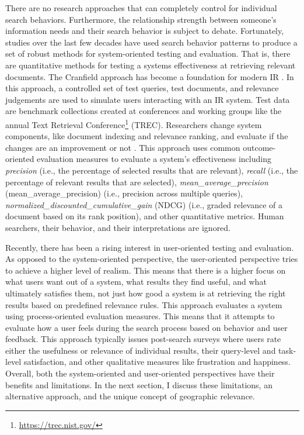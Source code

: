 There are no research approaches that can completely control for individual search behaviors. Furthermore, the relationship strength between someone's information needs and their search behavior is subject to debate. Fortunately, studies over the last few decades have used search behavior patterns to produce a set of robust methods for system-oriented testing and evaluation. That is, there are quantitative methods for testing a systems effectiveness at retrieving relevant documents. The Cranfield approach has become a foundation for modern IR \cite{Sanderson2010}. In this approach, a controlled set of test queries, test documents, and relevance judgements are used to simulate users interacting with an IR system. Test data are benchmark collections created at conferences and working groups like the annual Text Retrieval Conference\footnote{\url{https://trec.nist.gov/}} (\acrshort{TREC}). Researchers change system components, like document indexing and relevance ranking, and evaluate if the changes are an improvement or not \cite{McGill1979}. This approach uses common outcome-oriented evaluation measures to evaluate a system's effectiveness including \emph{\gls{precision}} (i.e., the percentage of selected results that are relevant), \emph{\gls{recall}} (i.e., the percentage of relevant results that are selected), \emph{\gls{mean_average_precision}} (\acrshort{mean_average_precision}) (i.e., precision across multiple queries), \emph{\gls{normalized_discounted_cumulative_gain}} (\acrshort{NDCG}) (i.e., graded relevance of a document based on its rank position), and other quantitative metrics. Human searchers, their behavior, and their interpretations are ignored.

Recently, there has been a rising interest in user-oriented testing and evaluation. As opposed to the system-oriented perspective, the user-oriented perspective tries to achieve a higher level of realism. This means that there is a higher focus on what users want out of a system, what results they find useful, and what ultimately satisfies them, not just how good a system is at retrieving the right results based on predefined relevance rules. This approach evaluates a system using process-oriented evaluation measures. This means that it attempts to evaluate how a user feels during the search process based on behavior and user feedback. This approach typically issues post-search surveys where users rate either the usefulness or relevance of individual results, their query-level and task-level satisfaction, and other qualitative measures like frustration and happiness. Overall, both the system-oriented and user-oriented perspectives have their benefits and limitations. In the next section, I discuss these limitations, an alternative approach, and the unique concept of geographic relevance.

